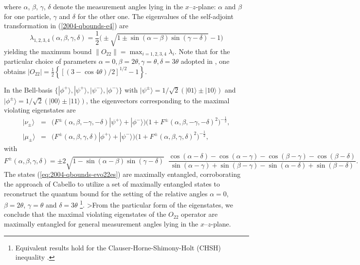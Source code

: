 \documentclass[pra,showpacs,showkeys,amsfonts,amsmath]{revtex4}
\begin{document}
where $\alpha$, $\beta$, $\gamma$, $\delta$ denote the measurement angles
lying in the $x$--$z$-plane: $\alpha$ and $\beta$ for one particle, $\gamma$ and
$\delta$ for the other one.
The eigenvalues of the self-adjoint transformation in
(\ref{2004-qbounds-e4}) are
\begin{equation}
  \label{eq:2004-qbounds-evo22}
  \lambda_{1,2,3,4}(\alpha,\beta,\gamma,\delta )
=
\frac{1}{2}\big(\pm\sqrt{1\pm\sin(\alpha -\beta )\sin(\gamma -\delta )}-1\big)
\end{equation}
yielding the maximum bound
$\|O_{22} \|= \max_{i=1,2,3,4} \lambda_i$.
Note that for the particular choice of parameters
$\alpha=0,\beta=2\theta,\gamma=\theta,\delta=3\theta$ adopted in
\cite{cabello-2003a,filipp-svo-04-qpoly}, one obtains $|O_{22}|=
\frac{1}{2}\left\{\left[ \left(3-\cos 4\theta \right)/2\right]^{1/2}
  -1\right\}$.

In the Bell-basis
$\{|\phi^+ \rangle,|\psi^+ \rangle,|\psi^- \rangle,|\phi^- \rangle\}$ with
$|\psi^\pm \rangle = 1/\sqrt{2}(|01 \rangle \pm |10 \rangle)$ and
$|\phi^\pm \rangle = 1/\sqrt{2}(|00 \rangle \pm |11 \rangle)$,
the eigenvectors corresponding to the maximal violating
eigenstates are
\begin{equation}
\begin{array}{ccl}
  |\nu_\pm \rangle&=&\big(F^\pm(\alpha,\beta,-\gamma ,-\delta  ) |\psi^+ \rangle +
  |\phi^- \rangle\big)\big(1+F^\pm(\alpha,\beta ,-\gamma,-\delta )^2\big)^{-\frac{1}{2}},\\
  |\mu_\pm \rangle&=&\big(F^\pm(\alpha,\beta,\gamma,\delta )|\phi^+ \rangle +
  |\psi^- \rangle\big)\big(1+F^\pm(\alpha ,\beta,\gamma,\delta )^2\big)^{-\frac{1}{2}},
\end{array}
\label{eq:2004-qbounds-evo22es}
\end{equation}
with
$$
F^\pm(\alpha ,\beta ,\gamma,\delta )=\pm 2\sqrt{1-\sin(\alpha -\beta )\sin(\gamma -\delta )}\;\;
 \frac{\cos(\alpha -\delta )-\cos(\alpha -\gamma )-\cos(\beta -\gamma )-\cos(\beta -\delta )}
{\sin(\alpha -\gamma )+\sin(\beta -\gamma )-\sin(\alpha -\delta )
  +\sin(\beta -\delta )}.
$$
The states (\ref{eq:2004-qbounds-evo22es})
are maximally entangled, corroborating the approach of
Cabello \cite{cabello-2003a} to utilize a set of
maximally entangled states to
reconstruct the quantum bound for the setting of the relative angles
$\alpha=0$, $\beta=2\theta$, $\gamma=\theta$ and $\delta=3\theta$ \footnote{
Equivalent results hold for the Clauser-Horne-Shimony-Holt (CHSH) inequality
 \cite{mermin-1995,cereceda-2001}.}.
>From the
particular form of the eigenstates, we conclude that the maximal
violating eigenstates of the $O_{22}$  operator are maximally
entangled for general measurement angles lying in the $x$--$z$-plane.
\end{document}
